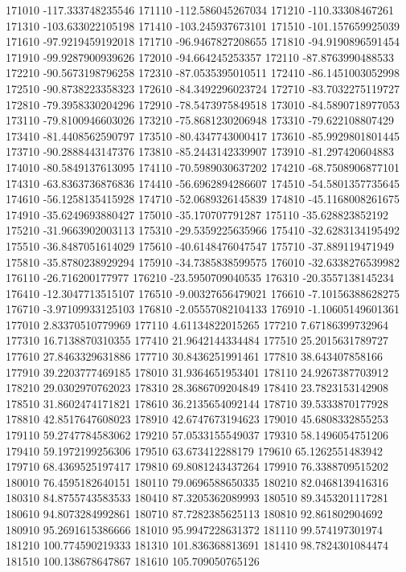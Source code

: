 {171010 -117.333748235546
171110 -112.586045267034
171210 -110.33308467261
171310 -103.633022105198
171410 -103.245937673101
171510 -101.157659925039
171610 -97.9219459192018
171710 -96.9467827208655
171810 -94.9190896591454
171910 -99.9287900939626
172010 -94.664245253357
172110 -87.8763990488533
172210 -90.5673198796258
172310 -87.0535395010511
172410 -86.1451003052998
172510 -90.8738223358323
172610 -84.3492296023724
172710 -83.7032275119727
172810 -79.3958330204296
172910 -78.5473975849518
173010 -84.5890718977053
173110 -79.8100946603026
173210 -75.8681230206948
173310 -79.622108807429
173410 -81.4408562590797
173510 -80.4347743000417
173610 -85.9929801801445
173710 -90.2888443147376
173810 -85.2443142339907
173910 -81.297420604883
174010 -80.5849137613095
174110 -70.5989030637202
174210 -68.7508906877101
174310 -63.8363736876836
174410 -56.6962894286607
174510 -54.5801357735645
174610 -56.1258135415928
174710 -52.0689326145839
174810 -45.1168008261675
174910 -35.6249693880427
175010 -35.170707791287
175110 -35.628823852192
175210 -31.9663902003113
175310 -29.5359225635966
175410 -32.6283134195492
175510 -36.8487051614029
175610 -40.6148476047547
175710 -37.889119471949
175810 -35.8780238929294
175910 -34.7385838599575
176010 -32.6338276539982
176110 -26.716200177977
176210 -23.5950709040535
176310 -20.3557138145234
176410 -12.3047713515107
176510 -9.00327656479021
176610 -7.10156388628275
176710 -3.97109933125103
176810 -2.05557082104133
176910 -1.10605149601361
177010 2.83370510779969
177110 4.61134822015265
177210 7.67186399732964
177310 16.7138870310355
177410 21.9642144334484
177510 25.2015631789727
177610 27.8463329631886
177710 30.8436251991461
177810 38.643407858166
177910 39.2203777469185
178010 31.9364651953401
178110 24.9267387703912
178210 29.0302970762023
178310 28.3686709204849
178410 23.7823153142908
178510 31.8602474171821
178610 36.2135654092144
178710 39.5333870177928
178810 42.8517647608023
178910 42.6747673194623
179010 45.6808332855253
179110 59.2747784583062
179210 57.0533155549037
179310 58.1496054751206
179410 59.1972199256306
179510 63.673412288179
179610 65.1262551483942
179710 68.4369525197417
179810 69.8081243437264
179910 76.3388709515202
180010 76.4595182640151
180110 79.0696588650335
180210 82.0468139416316
180310 84.8755743583533
180410 87.3205362089993
180510 89.3453201117281
180610 94.8073284992861
180710 87.7282385625113
180810 92.861802904692
180910 95.2691615386666
181010 95.9947228631372
181110 99.574197301974
181210 100.774590219333
181310 101.836368813691
181410 98.7824301084474
181510 100.138678647867
181610 105.709050765126
}
